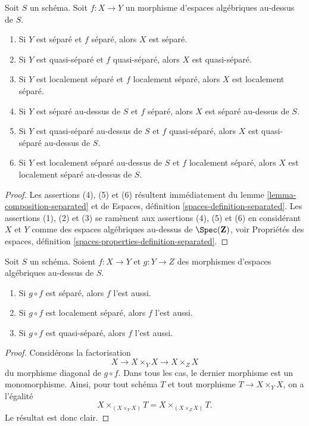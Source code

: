 \begin{lemma}
\label{lemma-separated-over-separated}
Soit $S$ un schéma.
Soit $f : X \to Y$ un morphisme d'espaces algébriques au-dessus de $S$.
\begin{enumerate}
\item Si $Y$ est séparé et $f$ séparé, alors $X$ est séparé.
\item Si $Y$ est quasi-séparé et $f$ quasi-séparé, alors
$X$ est quasi-séparé.
\item Si $Y$ est localement séparé et $f$ localement séparé, alors
$X$ est localement séparé.
\item Si $Y$ est séparé au-dessus de $S$ et $f$ séparé, alors
$X$ est séparé au-dessus de $S$.
\item Si $Y$ est quasi-séparé au-dessus de $S$ et $f$ quasi-séparé, alors
$X$ est quasi-séparé au-dessus de $S$.
\item Si $Y$ est localement séparé au-dessus de $S$ et $f$ localement séparé, alors
$X$ est localement séparé au-dessus de $S$.
\end{enumerate}
\end{lemma}

\begin{proof}
Les assertions (4), (5) et (6) résultent immédiatement du
lemme \ref{lemma-composition-separated}
et de
Espaces, définition \ref{spaces-definition-separated}.
Les assertions (1), (2) et (3) se ramènent aux assertions (4), (5) et (6) en considérant
$X$ et $Y$ comme des espaces algébriques au-dessus de $\Spec(\mathbf{Z})$, voir
Propriétés des espaces, définition \ref{spaces-properties-definition-separated}.
\end{proof}

\begin{lemma}
\label{lemma-compose-after-separated}
Soit $S$ un schéma.
Soient $f : X \to Y$ et $g : Y \to Z$ des morphismes d'espaces algébriques au-dessus de $S$.
\begin{enumerate}
\item Si $g \circ f$ est séparé, alors $f$ l'est aussi.
\item Si $g \circ f$ est localement séparé, alors $f$ l'est aussi.
\item Si $g \circ f$ est quasi-séparé, alors $f$ l'est aussi.
\end{enumerate}
\end{lemma}

\begin{proof}
Considérons la factorisation
$$
X \to X \times_Y X \to X \times_Z X
$$
du morphisme diagonal de $g \circ f$. Dans tous les cas, le dernier morphisme
est un monomorphisme. Ainsi, pour tout schéma $T$ et tout morphisme
$T \to X \times_Y X$, on a l'égalité
$$
X \times_{(X \times_Y X)} T = X \times_{(X \times_Z X)} T.
$$
Le résultat est donc clair.
\end{proof}

